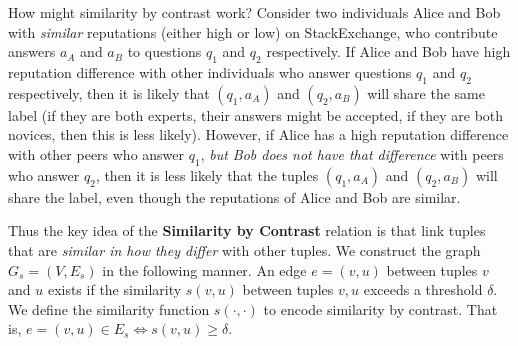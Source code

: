 How might similarity by contrast work? Consider two individuals Alice and Bob with \textit{similar} reputations (either high or low) on StackExchange, who contribute answers $a_A$ and $a_B$ to questions $q_1$ and $q_2$ respectively. If Alice and Bob have high reputation difference with other individuals who answer questions $q_1$ and $q_2$ respectively, then it is likely that $(q_1, a_A)$ and $(q_2, a_B)$ will share the same label (if they are both experts, their answers might be accepted, if they are both novices, then this is less likely). However, if Alice has a high reputation difference with other peers who answer $q_1$, \textit{but Bob does not have that difference} with peers who answer $q_2$, then it is less likely that the tuples $(q_1, a_A)$ and $(q_2, a_B)$ will share the label, even though the reputations of Alice and Bob are similar.

Thus the key idea of the \textbf{Similarity by Contrast} relation is that link tuples that are  \textit{similar in how they differ} with other tuples. We construct the graph $G_s = (V, E_s)$ in the following manner. An edge $e = (v,u)$ between tuples $v$ and $u$ exists if the similarity $s(v,u)$ between tuples $v,u$ exceeds a threshold $\delta$. We define the similarity function $s(\cdot , \cdot)$ to encode similarity by contrast. That is, $e=(v,u) \in E_s \iff s(v,u) \geq \delta$.


